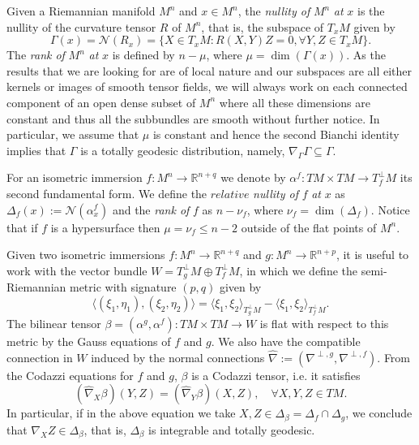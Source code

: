 \documentclass{article}
\theoremstyle{remark}
\begin{document}
Given a Riemannian manifold $M^n$ and $x\in M^n$, the {\it nullity of} $M^n$ {\it at} $x$ is the nullity of the curvature tensor $R$ of $M^n$, that is, the subspace of $T_xM$ given by
\begin{equation*}
    \Gamma(x)=\mathcal{N}(R_x)=\{X\in T_xM: R(X,Y)Z=0,\forall Y,Z\in T_xM\}.
\end{equation*}
The {\it rank of} $M^n$ {\it at} $x$ is defined by $n-\mu$, where $\mu=\dim(\Gamma(x))$. As the results that we are looking for are of local nature and our subspaces are all either kernels or images of smooth tensor fields, we will always  work on each connected component of an open dense subset of $M^n$ where all these dimensions are constant and thus all the subbundles are smooth without further notice. In particular, we assume that $\mu$ is constant and hence the second Bianchi identity implies that $\Gamma$ is a totally geodesic distribution, namely, $\nabla_{\Gamma}\Gamma\subseteq\Gamma$.

For an isometric immersion $f:M^n\rightarrow\mathbb{R}^{n+q}$ we denote by $\alpha^f:TM\times TM\rightarrow T^\perp _fM$ its second fundamental form. We define the $\mathit{relative}$ \emph{nullity of} $f$ \emph{at} $x$ as $\Delta_f(x):=\mathcal{N}(\alpha^f_x)$ and the \emph{rank of} $f$ as $n-\nu_f$, where $\nu_f=\dim(\Delta_f)$. Notice that if $f$ is a hypersurface then $\mu=\nu_f\leq n-2$ outside of the flat points of $M^n$. 

Given two isometric immersions $f:M^n\rightarrow\mathbb{R}^{n+q}$ and $g:M^n\rightarrow\mathbb{R}^{n+p}$, it is useful to work with the vector bundle $W=T^\perp_g M\oplus T^\perp_f M$, in which we define the semi-Riemannian metric with signature $(p,q)$ given by
\begin{equation*}
    \langle(\xi_1,\eta_1),(\xi_2,\eta_2)\rangle=\langle\xi_1,\xi_2\rangle_{T^{\perp}_gM}-\langle\xi_1,\xi_2\rangle_{T^{\perp}_fM}.
\end{equation*}
The bilinear tensor $\beta=(\alpha^g,\alpha^f):TM\times TM\rightarrow W$ is flat with respect to this metric by the Gauss equations of $f$ and $g$.
We also have the compatible connection in $W$ induced by the normal connections $\hat{\nabla}:=(\nabla^{\perp,g},\nabla^{\perp,f})$.
From the Codazzi equations for $f$ and $g$, $\beta$ is a Codazzi tensor, i.e. it satisfies
\begin{equation*}
    (\hat{\nabla}_X\beta)(Y,Z)=(\hat{\nabla}_Y\beta)(X,Z),\quad\forall X,Y,Z\in TM.
\end{equation*}
In particular, if in the above equation we take $X,Z\in\Delta_{\beta}=\Delta_f\cap \Delta_g$, we conclude that $\nabla_X Z\in\Delta_\beta$, that is, $\Delta_\beta$ is integrable and totally geodesic. 
\end{document}

